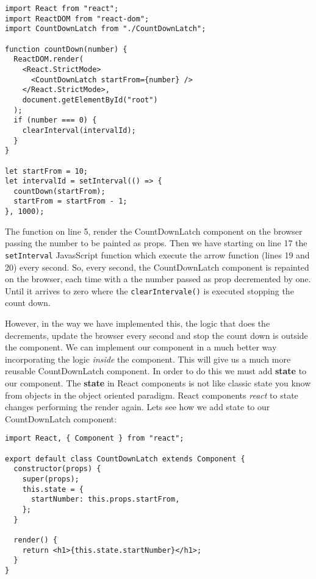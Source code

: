 \documentclass[a4paper, oneside, titlepage, 12pt]{book}
\begin{document}
\begin{verbatim}
import React from "react";
import ReactDOM from "react-dom";
import CountDownLatch from "./CountDownLatch";

function countDown(number) {
  ReactDOM.render(
    <React.StrictMode>
      <CountDownLatch startFrom={number} />
    </React.StrictMode>,
    document.getElementById("root")
  );
  if (number === 0) {
    clearInterval(intervalId);
  }
}

let startFrom = 10;
let intervalId = setInterval(() => {
  countDown(startFrom);
  startFrom = startFrom - 1;
}, 1000);
\end{verbatim}

The function on line 5, render the CountDownLatch component on the browser passing the number to be painted as props. Then we have starting on line 17 the \texttt{setInterval} JavasScript function which execute the arrow function (lines 19 and 20) every second. So, every second, the CountDownLatch component is repainted on the browser, each time with a the number passed as prop decremented by one. Until it arrives to zero where the \texttt{clearIntervale()} is executed stopping the count down.
\newline 

However, in the way we have implemented this, the logic that does the decrements, update the browser every second and stop the count down is outside the component. We can implement our component in a much better way incorporating the logic \textit{inside} the component. This will give us a much more reusable CountDownLatch component. In order to do this we must add \textbf{state} to our component. The \textbf{state} in React components is not like classic state you know from objects in the object oriented paradigm. React components \textit{react} to state changes performing the render again. Lets see how we add state to our CountDownLatch component:

\begin{verbatim}
import React, { Component } from "react";

export default class CountDownLatch extends Component {
  constructor(props) {
    super(props);
    this.state = {
      startNumber: this.props.startFrom,
    };
  }

  render() {
    return <h1>{this.state.startNumber}</h1>;
  }
}
\end{verbatim}
 
\end{document}
